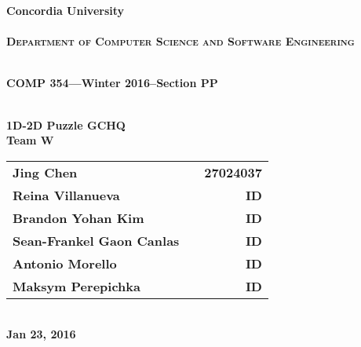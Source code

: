 \newpage
\begin{center}
\thispagestyle{empty}
\Large{\textbf{Concordia University\\ \large{}}}\\[0.7cm]
\LARGE{\textsc {\textbf{Department of Computer Science
and Software Engineering}}}\\[0.5cm]
\vspace{0.5cm}

\Large{\textbf{\\COMP 354---Winter 2016--Section PP\\}}
\vspace{1cm}

\Large{\textbf{\\1D-2D Puzzle GCHQ}}
\Large{\textbf{\\Team W}}

\begin{table}[h]
\centering
\Large{
\begin{tabular}{>{\bfseries}lc>{\bfseries}r}
Jing Chen & & 27024037\\Reina Villanueva & & ID\\Brandon Yohan Kim & & ID\\Sean-Frankel Gaon Canlas & & ID\\Antonio Morello & & ID\\Maksym Perepichka & & ID\\
\end{tabular}}
\end{table}

\Large{\textbf{\\Jan 23, 2016}}
\newpage
\end{center}
